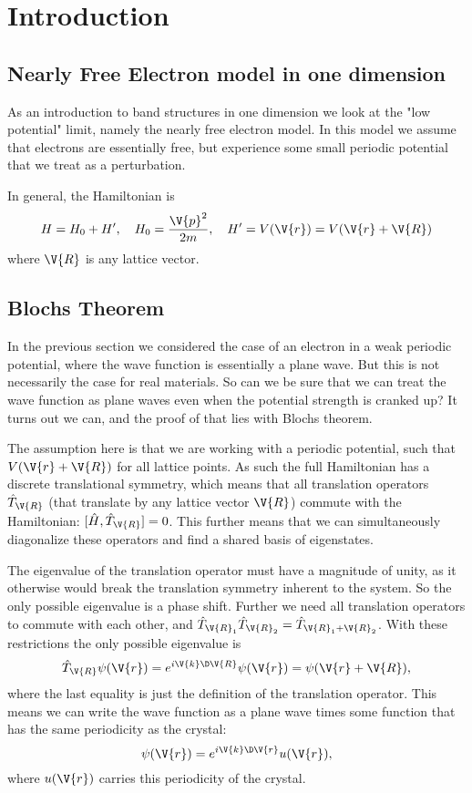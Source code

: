 \documentclass[main.tex]{subfiles}
\begin{document}
	\section{Introduction}
	
	
	\subsection{Nearly Free Electron model in one dimension}
	As an introduction to band structures in one dimension we look at the "low potential" limit, namely the nearly free electron model. In this model we assume that electrons are essentially free, but experience some small periodic potential that we treat as a perturbation.
	
	In general, the Hamiltonian is
	\begin{equation}\label{key}
		H = H_0 + H', \quad H_0 = \frac{\V{p}^2}{2m}, \quad H' = V(\V{r}) = V(\V{r} + \V{R})
	\end{equation}
	where $ \V{R} $ is any lattice vector.
	
	
	
	\subsection{Blochs Theorem}
	In the previous section we considered the case of an electron in a weak periodic potential, where the wave function is essentially a plane wave. But this is not necessarily the case for real materials. So can we be sure that we can treat the wave function as plane waves even when the potential strength is cranked up? It turns out we can, and the proof of that lies with Blochs theorem.
	
	The assumption here is that we are working with a periodic potential, such that $ V(\V{r} + \V{R}) $ for all lattice points. As such the full Hamiltonian has a discrete translational symmetry, which means that all translation operators $ \hat{T}_{\V{R}} $ (that translate by any lattice vector $ \V{R} $) commute with the Hamiltonian: $ [\hat{H}, \hat{T}_{\V{R}}] = 0$. This further means that we can simultaneously diagonalize these operators and find a shared basis of eigenstates.
	
	The eigenvalue of the translation operator must have a magnitude of unity, as it otherwise would break the translation symmetry inherent to the system. So the only possible eigenvalue is a phase shift. Further we need all translation operators to commute with each other, and $ \hat{T}_{\V{R}_1} \hat{T}_{\V{R}_2} = \hat{T}_{\V{R}_1 + \V{R}_2} $. With these restrictions the only possible eigenvalue is
	\begin{equation}\label{key}
		\hat{T}_{\V{R}} \psi(\V{r}) = e^{i\V{k} \D\V{R}} \psi(\V{r}) = \psi(\V{r}+\V{R}),
	\end{equation}
	where the last equality is just the definition of the translation operator. This means we can write the wave function as a plane wave times some function that has the same periodicity as the crystal:
	\begin{equation}\label{key}
		\psi(\V{r}) = e^{i\V{k} \D \V{r}} u(\V{r}),
	\end{equation}
	where $ u(\V{r}) $ carries this periodicity of the crystal.
	
\end{document}
